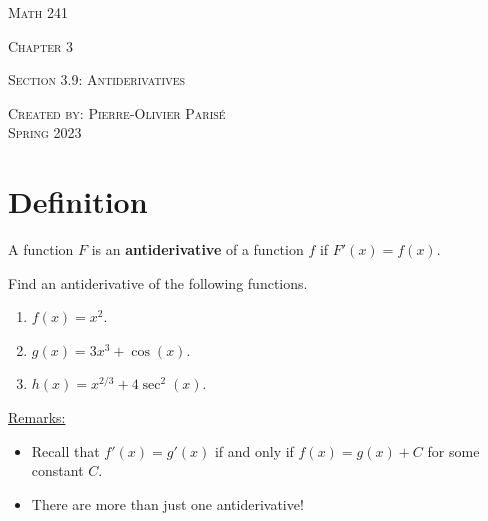 \documentclass[12pt,a4paper]{article}
\newcounter{example}[section]
\begin{document}
\thispagestyle{empty}

\begin{center}
\vspace*{2.5cm}

{\Huge \textsc{Math 241}}

\vspace*{2cm}

{\LARGE \textsc{Chapter 3}} 

\vspace*{0.75cm}

\noindent\textsc{Section 3.9: Antiderivatives}

\vspace*{0.75cm}

\tableofcontents

\vfill

\noindent \textsc{Created by: Pierre-Olivier Paris{\'e}} \\
\textsc{Spring 2023}
\end{center}

\newpage

\section{Definition}
A function $F$ is an \textbf{antiderivative} of a function $f$ if $F'(x) = f(x)$.

\vspace*{16pt}

\begin{example}
Find an antiderivative of the following functions.
\begin{multicols}{3}
	\begin{enumerate}[label=\textbf{(\alph*)}]
	\item $f(x) = x^2$.
	\item $g(x) = 3x^3 + \cos (x)$.
	\item $h(x) = x^{2/3} + 4 \sec^2 (x)$.
	\end{enumerate}
\end{multicols}
\end{example}

\vfill

\underline{Remarks:}
	\begin{itemize}
	\item Recall that $f'(x) = g'(x)$ if and only if $f(x) = g(x) + C$ for some constant $C$.
	\item There are more than just one antiderivative!
	\end{itemize}
\end{document}
